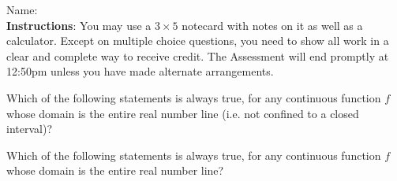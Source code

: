 \documentclass[addpoints]{exam}
\begin{document}
		
\vspace*{0pt}

\noindent
Name: \underline{\hspace{2in}} \\


\noindent
\textbf{Instructions}:  You may use a $3 \times 5$ notecard with notes on it as well as a calculator. Except on multiple choice questions, you need to show all work in a clear and complete way to receive credit. The Assessment will end promptly at 12:50pm unless you have made alternate arrangements. 

\begin{questions}


\question[2] Which of the following statements is always true, for any continuous function $f$ whose domain is the entire real number line (i.e. not confined to a closed interval)? 
	
\question[2] Which of the following statements is always true, for any continuous function $f$ whose domain is the entire real number line? 
\end{questions}
\end{document}
